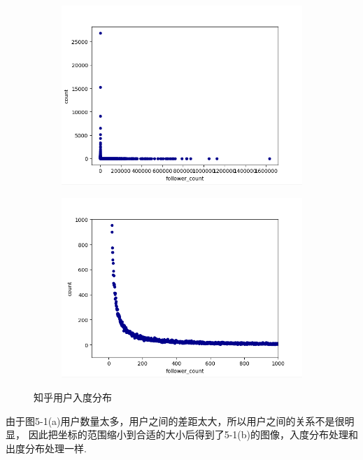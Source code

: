 \documentclass[bachelor,adobefonts]{jnuthesis}
\begin{document}
\begin{figure}[h!]
  \centering
  \begin{subfigure}[b]{0.49\linewidth}
    \includegraphics[width=\linewidth]{Wfollower-1.png}
    \caption{}
  \end{subfigure}
  \begin{subfigure}[b]{0.49\linewidth}
    \includegraphics[width=\linewidth]{Wfollower-2.png}
    \caption{}
  \end{subfigure}
  \caption{知乎用户入度分布}
\end{figure}


由于图5-1(a)用户数量太多，用户之间的差距太大，所以用户之间的关系不是很明显，
因此把坐标的范围缩小到合适的大小后得到了5-1(b)的图像，入度分布处理和出度分布处理一样.
\end{document}
